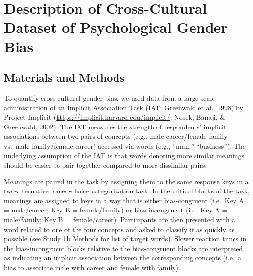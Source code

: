 \documentclass[man,floatsintext]{apa6}
\begin{document}
\hypertarget{description-of-cross-cultural-dataset-of-psychological-gender-bias}{%
\section{Description of Cross-Cultural Dataset of Psychological Gender Bias}\label{description-of-cross-cultural-dataset-of-psychological-gender-bias}}

\hypertarget{materials-and-methods}{%
\subsection{Materials and Methods}\label{materials-and-methods}}

To quantify cross-cultural gender bias, we used data from a large-scale administration of an Implicit Association Task (IAT; Greenwald et al., 1998) by Project Implicit (\url{https://implicit.harvard.edu/implicit/}; Nosek, Banaji, \& Greenwald, 2002). The IAT measures the strength of respondents' implicit associations between two pairs of concepts (e.g., male-career/female-family vs.~male-family/female-career) accessed via words (e.g., \enquote{man,} \enquote{business}). The underlying assumption of the IAT is that words denoting more similar meanings should be easier to pair together compared to more dissimilar pairs.

Meanings are paired in the task by assigning them to the same response keys in a two-alternative forced-choice categorization task. In the critical blocks of the task, meanings are assigned to keys in a way that is either bias-congruent (i.e.~Key A = male/career; Key B = female/family) or bias-incongruent (i.e.~Key A = male/family; Key B = female/career). Participants are then presented with a word related to one of the four concepts and asked to classify it as quickly as possible (see Study 1b Methods for list of target words). Slower reaction times in the bias-incongruent blocks relative to the bias-congruent blocks are interpreted as indicating an implicit association between the corresponding concepts (i.e.~a bias to associate male with career and female with family).
\end{document}
